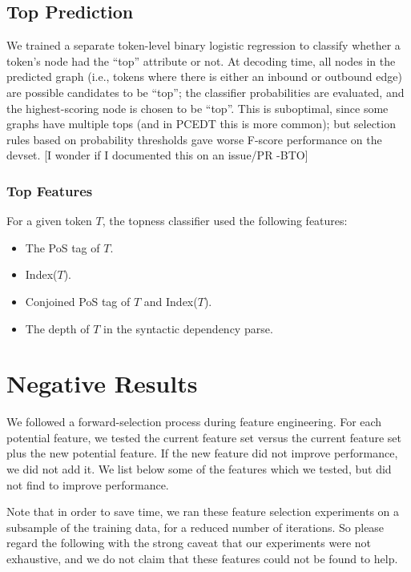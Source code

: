 \documentclass[11pt]{article}
\newcommand{\bocomment}[1]{\textcolor{Bittersweet}{[#1 -BTO]}}
\begin{document}
\subsection{Top Prediction} \label{s:top_model}

We trained a separate token-level binary logistic regression to classify
whether a token's node had the ``top'' attribute or not.
At decoding time, all nodes in the predicted graph (i.e., tokens where there is
either an inbound or outbound edge) are possible candidates to be ``top'';
the classifier probabilities are evaluated, and the highest-scoring node is
chosen to be ``top''.
This is suboptimal, since some graphs have multiple tops (and in PCEDT this is
more common);
but selection rules based on probability thresholds gave worse F-score
performance on the devset. \bocomment{I wonder if I documented this on an issue/PR}


\subsubsection{Top Features}
For a given token $T$, the topness classifier used the following features:
\begin{itemize}
\item The PoS tag of $T$.
\item Index($T$).
\item Conjoined PoS tag of $T$ and Index($T$).
\item The depth of $T$ in the syntactic dependency parse. 
\end{itemize}






\section{Negative Results}

We followed a forward-selection process during feature engineering.
For each potential feature, we tested the current feature set versus the current
feature set plus the new potential feature.
If the new feature did not improve performance, we did not add it.
We list below some of the features which we tested, but did not find to improve
performance.

Note that in order to save time, we ran these feature selection experiments
on a subsample of the training data, for a reduced number of iterations.
So please regard the following with the strong caveat that our experiments were
not exhaustive, and we do not claim that these features could not be found to
help.
\end{document}

